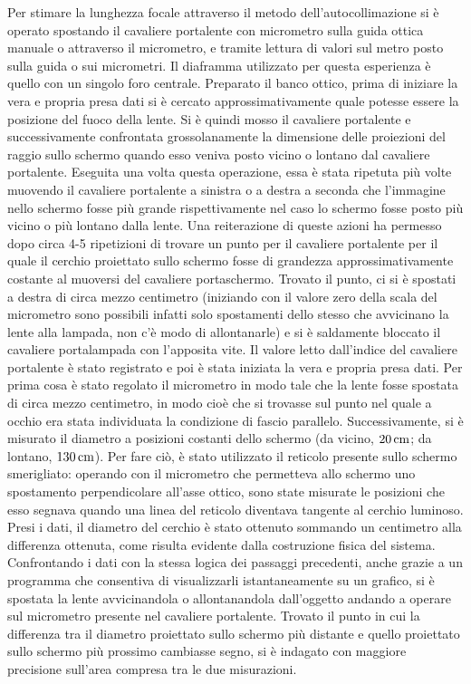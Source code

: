 Per stimare la lunghezza focale attraverso il metodo 
dell'autocollimazione si è operato spostando il cavaliere portalente 
con micrometro sulla guida ottica manuale o attraverso il 
micrometro, e tramite lettura di valori sul metro posto sulla guida 
o sui micrometri. Il diaframma utilizzato per questa esperienza è 
quello con un singolo foro centrale. \newline Preparato il banco 
ottico, prima di iniziare la vera e propria presa dati si è cercato 
approssimativamente quale potesse essere la posizione del fuoco 
della lente. Si è quindi mosso il cavaliere portalente e 
successivamente confrontata grossolanamente la dimensione delle 
proiezioni del raggio sullo schermo quando esso veniva posto vicino 
o lontano dal cavaliere portalente. Eseguita una volta questa 
operazione, essa è stata ripetuta più volte muovendo il cavaliere 
portalente a sinistra o a destra a seconda che l'immagine nello 
schermo fosse più grande rispettivamente nel caso lo schermo fosse 
posto più vicino o più lontano dalla lente. Una reiterazione di 
queste azioni ha permesso dopo circa 4-5 ripetizioni di trovare un 
punto per il cavaliere portalente per il quale il cerchio proiettato 
sullo schermo fosse di grandezza approssimativamente costante al 
muoversi del cavaliere portaschermo. \newline Trovato il punto, ci si 
è spostati a destra di circa mezzo centimetro (iniziando con il 
valore zero della scala del micrometro sono possibili infatti solo 
spostamenti dello stesso che avvicinano la lente alla lampada, non 
c'è modo di allontanarle) e si è saldamente bloccato il cavaliere 
portalampada con l'apposita vite. Il valore letto dall'indice del 
cavaliere portalente è stato registrato e poi è stata iniziata la 
vera e propria presa dati. Per prima cosa è stato regolato il 
micrometro in modo tale che la lente fosse spostata di circa mezzo 
centimetro, in modo cioè che si trovasse sul punto nel quale a 
occhio era stata individuata la condizione di fascio parallelo. 
Successivamente, si è misurato il diametro a posizioni costanti 
dello schermo (da vicino, $20\,\mathrm{cm}$; da lontano, $130\,\mathrm{cm}$). Per fare 
ciò, è stato utilizzato il reticolo presente sullo schermo 
smerigliato: operando con il micrometro che permetteva allo schermo 
uno spostamento perpendicolare all'asse ottico, sono state misurate 
le posizioni che esso segnava quando una linea del reticolo 
diventava tangente al cerchio luminoso. Presi i dati, il diametro 
del cerchio \`e stato ottenuto sommando un centimetro alla 
differenza ottenuta, come risulta evidente dalla costruzione fisica 
del sistema. Confrontando i dati con la stessa logica dei passaggi 
precedenti, anche grazie a un programma che consentiva di 
visualizzarli istantaneamente su un grafico, si è spostata la lente 
avvicinandola o allontanandola dall'oggetto andando a operare sul 
micrometro presente nel cavaliere portalente. Trovato il punto in 
cui la differenza tra il diametro proiettato sullo schermo più 
distante e quello proiettato sullo schermo più prossimo cambiasse 
segno, si è indagato con maggiore precisione sull'area compresa tra 
le due misurazioni.

